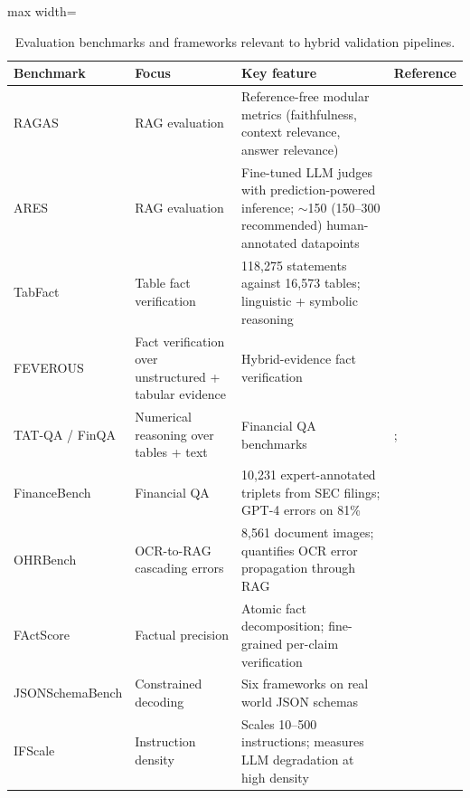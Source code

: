 \begin{table}[htbp]
\centering
\caption{Evaluation benchmarks and frameworks relevant to hybrid validation pipelines.}
\label{tab:lr:benchmarks}
\footnotesize
\begin{adjustbox}{max width=\textwidth}
\begin{tabular}{@{}p{2.1cm}p{2.6cm}p{6.3cm}p{2.6cm}@{}}
\toprule
\textbf{Benchmark} & \textbf{Focus} & \textbf{Key feature} & \textbf{Reference} \\
\midrule
RAGAS           & RAG evaluation                                  & Reference-free modular metrics (faithfulness, context relevance, answer relevance)                              & \citet{es2024}                       \\
ARES            & RAG evaluation                                  & Fine-tuned LLM judges with prediction-powered inference; $\sim$150 (150--300 recommended) human-annotated datapoints & \citet{saadfalcon2024}            \\
TabFact         & Table fact verification                         & 118,275 statements against 16,573 tables; linguistic + symbolic reasoning                                       & \citet{chen2020tabfact}              \\
FEVEROUS        & Fact verification over unstructured + tabular evidence & Hybrid-evidence fact verification                                                                       & \citet{aly2021}                      \\
TAT-QA / FinQA  & Numerical reasoning over tables + text          & Financial QA benchmarks                                                                                        & \citet{zhu2021}; \citet{chen2021finqa} \\
FinanceBench    & Financial QA                                    & 10,231 expert-annotated triplets from SEC filings; GPT-4 errors on 81\%                                         & \citet{islam2023}                    \\
OHRBench        & OCR-to-RAG cascading errors                     & 8,561 document images; quantifies OCR error propagation through RAG                                             & \citet{zhang2025ocr}                 \\
FActScore       & Factual precision                               & Atomic fact decomposition; fine-grained per-claim verification                                                 & \citet{min2023factscore}             \\
JSONSchemaBench & Constrained decoding                            & Six frameworks on real world JSON schemas                                                                      & \citet{geng2025}                     \\
IFScale         & Instruction density                             & Scales 10--500 instructions; measures LLM degradation at high density                                          & \citet{jaroslawicz2025}              \\
\bottomrule
\end{tabular}
\end{adjustbox}
\end{table}
